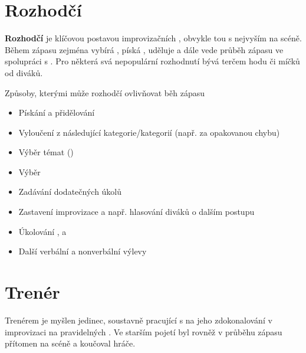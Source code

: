 \documentclass[main.tex]{subfiles}
\begin{document}
 
 
\needspace{5cm} \section{Rozhodčí} \label{rozhodčí} \textbf{Rozhodčí}{} je klíčovou postavou improvizačních , obvykle tou s nejvyším  na scéně. 
Během zápasu zejména vybírá , píská , uděluje   a  
dále vede průběh zápasu ve spolupráci s . 
Pro některá svá nepopulární rozhodnutí bývá terčem hodu  či míčků od diváků. 
 
 
Způsoby, kterými může rozhodčí ovlivňovat běh zápasu 
\begin{itemize}
\item Pískání  a přidělování 
\item Vyloučení z následující kategorie/kategorií (např. za opakovanou chybu)
\item Výběr témat ()
\item Výběr 
\item Zadávání dodatečných úkolů 
\item Zastavení improvizace a např. hlasování diváků o dalším postupu
\item Úkolování ,  a 
\item Další verbální a nonverbální výlevy
\end{itemize}
 
 
\needspace{5cm} \section{Trenér} \label{trenér} Trenérem je myšlen jedinec, soustavně pracující s  na jeho zdokonalování v improvizaci na pravidelných 
. 
Ve starším pojetí  byl rovněž v průběhu zápasu přítomen na scéně a koučoval hráče. 
  
\end{document}

